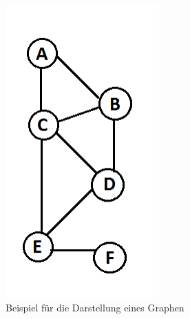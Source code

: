 \begin{figure}
	\begin{center}
	\includegraphics[width=1\columnwidth]{img/graph1.png}
	\caption{Beispiel für die Darstellung eines Graphen \cite{Kleinberg-2009-oz}}
	\label{fig:graph1}
	\end{center}
\end{figure}


